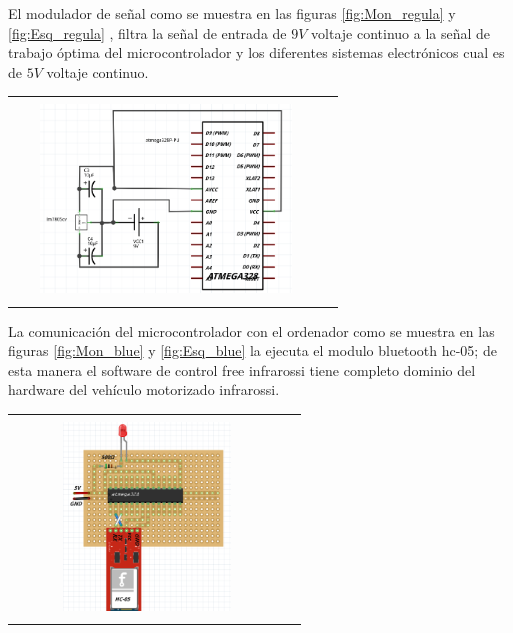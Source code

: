 \documentclass[12]{article}
\newenvironment{Figure}
{\par\medskip\noindent\minipage{\linewidth}}
{\endminipage\par\medskip}
\begin{document}
\begin{multicols}{2}
\begin{Figure}
\label{fig:Mon_regula}
\end{Figure}
\vspace{1cm}
El modulador de señal como se muestra en las figuras \ref{fig:Mon_regula} y \ref{fig:Esq_regula} , filtra la señal de entrada de $9 V$ voltaje continuo a la señal de trabajo óptima del microcontrolador y los diferentes sistemas electrónicos cual es de $5 V$ voltaje continuo. 
\begin{Figure}
\center
\begin{tabular}{|l|r|}
\hline
\\
\includegraphics[width=8cm, height=5cm]{img/G2.png}  \\\\ \hline
\end{tabular}
\label{fig:Esq_regula}
\end{Figure}
La comunicación del microcontrolador con el ordenador como se muestra en las figuras  \ref{fig:Mon_blue} y \ref{fig:Esq_blue} la ejecuta el modulo bluetooth hc-05; de esta manera el software de control free infrarossi tiene completo dominio del hardware del vehículo motorizado infrarossi.
\begin{Figure}
\center
\begin{tabular}{|l|r|}
\hline
\\
\includegraphics[width=7cm, height=5cm]{img/F3.png}  \\\\ \hline

\end{tabular}
\end{Figure}
\end{multicols}
\end{document}
